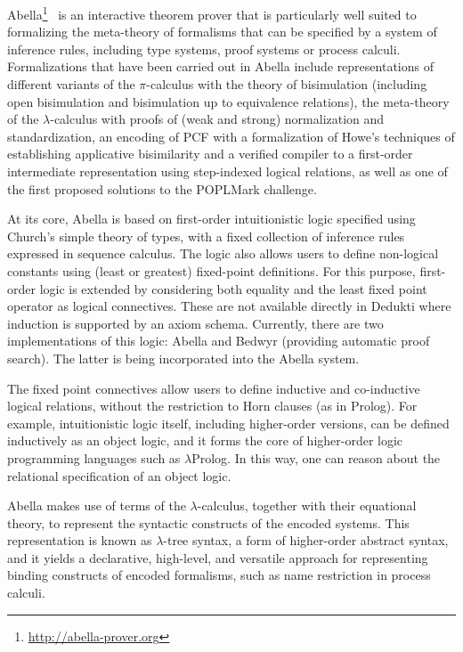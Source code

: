 Abella\footnote{\url{http://abella-prover.org}}~\cite{baelde:abella} is an
interactive theorem prover that is particularly well suited to formalizing the
meta-theory of formalisms that can be specified by a system of inference rules,
including type systems, proof systems or process calculi. Formalizations that
have been carried out in Abella include representations of different variants of
the $\pi$-calculus with the theory of bisimulation (including open bisimulation
and bisimulation up to equivalence relations), the meta-theory of the
$\lambda$-calculus with proofs of (weak and strong) normalization and
standardization, an encoding of PCF with a formalization of Howe's techniques of
establishing applicative bisimilarity and a verified compiler to a first-order
intermediate representation using step-indexed logical relations, as well as one
of the first proposed solutions to the POPLMark challenge.

At its core, Abella is based on first-order intuitionistic logic specified using
Church's simple theory of types, with a fixed collection of inference rules
expressed in sequence calculus. The logic also allows users to define
non-logical constants using (least or greatest) fixed-point definitions. For
this purpose, first-order logic is extended by considering both equality and the
least fixed point operator as logical connectives. These are not available
directly in Dedukti where induction is supported by an axiom schema. Currently,
there are two implementations of this logic: Abella and Bedwyr (providing
automatic proof search). The latter is being incorporated into the Abella
system.

The fixed point connectives allow users to define inductive and co-inductive
logical relations, without the restriction to Horn clauses (as in Prolog). For
example, intuitionistic logic itself, including higher-order versions, can be
defined inductively as an object logic, and it forms the core of higher-order
logic programming languages such as $\lambda$Prolog. In this way, one can reason
about the relational specification of an object logic.

Abella makes use of terms of the $\lambda$-calculus, together with their
equational theory, to represent the syntactic constructs of the encoded systems.
This representation is known as $\lambda$-tree syntax, a form of higher-order
abstract syntax, and it yields a declarative, high-level, and versatile approach
for representing binding constructs of encoded formalisms, such as name
restriction in process calculi.


